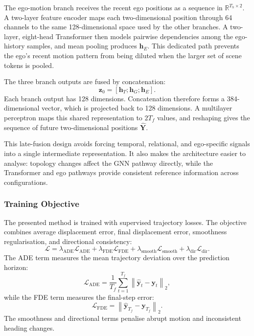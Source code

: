 The ego-motion branch receives the recent ego positions as a sequence in \(\mathbb{R}^{T_h\times 2}\). A two-layer feature encoder maps each two-dimensional position through 64 channels to the same 128-dimensional space used by the other branches. A two-layer, eight-head Transformer then models pairwise dependencies among the ego-history samples, and mean pooling produces \(\mathbf{h}_E\). This dedicated path prevents the ego's recent motion pattern from being diluted when the larger set of scene tokens is pooled.

The three branch outputs are fused by concatenation:
\begin{equation}
    \mathbf{z}_0 =
    [\mathbf{h}_T;\mathbf{h}_G;\mathbf{h}_E].
    \label{eq:chapter_fusion_concat}
\end{equation}
Each branch output has 128 dimensions. Concatenation therefore forms a 384-dimensional vector, which is projected back to 128 dimensions. A multilayer perceptron maps this shared representation to \(2T_f\) values, and reshaping gives the sequence of future two-dimensional positions \(\hat{\mathbf{Y}}\).

This late-fusion design avoids forcing temporal, relational, and ego-specific signals into a single intermediate representation. It also makes the architecture easier to analyse: topology changes affect the GNN pathway directly, while the Transformer and ego pathways provide consistent reference information across configurations.

\subsubsection{Training Objective}
\label{subsubsec:magnet_training_objective}

The presented method is trained with supervised trajectory losses. The objective combines average displacement error, final displacement error, smoothness regularisation, and directional consistency:
\begin{equation}
\mathcal{L}
=
\lambda_{\mathrm{ADE}}\mathcal{L}_{\mathrm{ADE}}
+
\lambda_{\mathrm{FDE}}\mathcal{L}_{\mathrm{FDE}}
+
\lambda_{\mathrm{smooth}}\mathcal{L}_{\mathrm{smooth}}
+
\lambda_{\mathrm{dir}}\mathcal{L}_{\mathrm{dir}}.
\label{eq:chapter_total_loss}
\end{equation}
The ADE term measures the mean trajectory deviation over the prediction horizon:
\begin{equation}
\mathcal{L}_{\mathrm{ADE}}
=
\frac{1}{T_f}
\sum_{t=1}^{T_f}
\left\|
\hat{\mathbf{y}}_t-\mathbf{y}_t
\right\|_2,
\label{eq:chapter_ade_loss}
\end{equation}
while the FDE term measures the final-step error:
\begin{equation}
\mathcal{L}_{\mathrm{FDE}}
=
\left\|
\hat{\mathbf{y}}_{T_f}-\mathbf{y}_{T_f}
\right\|_2.
\label{eq:chapter_fde_loss}
\end{equation}
The smoothness and directional terms penalise abrupt motion and inconsistent heading changes.


